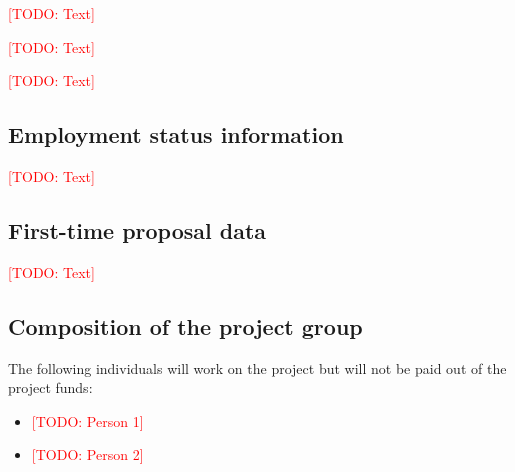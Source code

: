 \documentclass[american,firsttime]{dfgproposal}
\newcommand{\todo}[1]{\xspace{\textcolor{red}{[TODO: #1]}}\xspace}
\begin{document}
	\todo{Text}
	
	\todo{Text}
	
	\todo{Text}
	
	
	\subsection{Employment status information}
	\todo{Text}
	
	\subsection{First-time proposal data}
	\todo{Text}
	
	
	
	\subsection{Composition of the project group}
	The following individuals will work on the project but will not be paid out of
	the project funds:
	\begin{itemize}
		\item \todo{Person 1}
		\item \todo{Person 2}
	\end{itemize}
	
\end{document}
